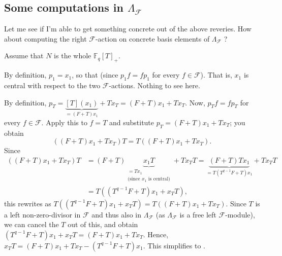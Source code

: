 \documentclass[numbers=enddot,12pt,final,onecolumn,notitlepage]{scrartcl}%
\theoremstyle{definition}
\begin{document}
\subsection{Some computations in $\Lambda_{\mathcal{F}}$}

Let me see if I'm able to get something concrete out of the above reveries.
How about computing the right $\mathcal{F}$-action on concrete basis elements
of $\Lambda_{\mathcal{F}}$ ?

Assume that $N$ is the whole $\mathbb{F}_{q}\left[  T\right]  _{+}$.

By definition, $p_{1}=x_{1}$, so that  (since $p_{1}f=fp_{1}$ for every $f\in\mathcal{F}$). That
is, $x_{1}$ is central with respect to the two $\mathcal{F}$-actions. Nothing
to see here.

By definition, $p_{T}=\underbrace{\left[  T\right]  \left(  x_{1}\right)
}_{=\left(  F+T\right)  x_{1}}+Tx_{T}=\left(  F+T\right)  x_{1}+Tx_{T}$. Now,
$p_{T}f=fp_{T}$ for every $f\in\mathcal{F}$. Apply this to $f=T$ and
substitute $p_{T}=\left(  F+T\right)  x_{1}+Tx_{T}$; you obtain%
\[
\left(  \left(  F+T\right)  x_{1}+Tx_{T}\right)  T=T\left(  \left(
F+T\right)  x_{1}+Tx_{T}\right)  .
\]
Since%
\begin{align*}
\left(  \left(  F+T\right)  x_{1}+Tx_{T}\right)  T  &  =\left(  F+T\right)
\underbrace{x_{1}T}_{\substack{=Tx_{1}\\\text{(since }x_{1}\text{ is
central)}}}+Tx_{T}T=\underbrace{\left(  F+T\right)  Tx_{1}}_{=T\left(
T^{q-1}F+T\right)  x_{1}}+Tx_{T}T\\
&  =T\left(  \left(  T^{q-1}F+T\right)  x_{1}+x_{T}T\right)  ,
\end{align*}
this rewrites as $T\left(  \left(  T^{q-1}F+T\right)  x_{1}+x_{T}T\right)
=T\left(  \left(  F+T\right)  x_{1}+Tx_{T}\right)  $. Since $T$ is a left
non-zero-divisor in $\mathcal{F}$ and thus also in $\Lambda_{\mathcal{F}}$ (as
$\Lambda_{\mathcal{F}}$ is a free left $\mathcal{F}$-module), we can cancel
the $T$ out of this, and obtain $\left(  T^{q-1}F+T\right)  x_{1}%
+x_{T}T=\left(  F+T\right)  x_{1}+Tx_{T}$. Hence, $x_{T}T=\left(  F+T\right)
x_{1}+Tx_{T}-\left(  T^{q-1}F+T\right)  x_{1}$. This simplifies to
\newline{}.
\end{document}
